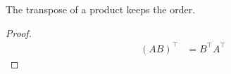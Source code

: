 \begin{theorem}
The transpose of a product keeps the order.
\end{theorem}
\begin{proof}
\begin{align*}
(A B)^\top &= B^\top A^\top
\end{align*}
\end{proof}
